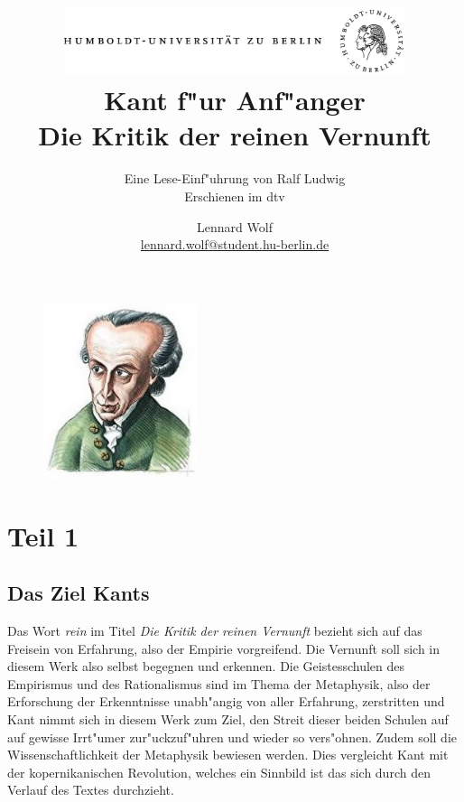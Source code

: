 \documentclass[]{scrartcl}
\begin{document}
\title{
	\includegraphics*[width=0.75\textwidth]{images/hu_logo.png}\\
	\vspace{24pt}
	Kant f"ur Anf"anger\\Die Kritik der reinen Vernunft}
\subtitle{Eine Lese-Einf"uhrung von Ralf Ludwig\\
          Erschienen im dtv}
\author{Lennard Wolf\\
        \href{mailto:lennard.wolf@student.hu-berlin.de}{lennard.wolf@student.hu-berlin.de}}
\maketitle

\begin{figure}[h]
	\centering
	\includegraphics[width=0.4\textwidth]{images/kant/kant_a.jpg}
\end{figure}
\newpage

\tableofcontents
\newpage

\section{Teil 1}

\subsection{Das Ziel Kants}

Das Wort \emph{rein} im Titel \emph{Die Kritik der reinen Vernunft} bezieht sich auf das Freisein von Erfahrung, also der Empirie vorgreifend. Die Vernunft soll sich in diesem Werk also selbst begegnen und erkennen. Die Geistesschulen des Empirismus und des Rationalismus sind im Thema der Metaphysik, also der Erforschung der Erkenntnisse unabh"angig von aller Erfahrung, zerstritten und Kant nimmt sich in diesem Werk zum Ziel, den Streit dieser beiden Schulen auf auf gewisse Irrt"umer zur"uckzuf"uhren und wieder so vers"ohnen. Zudem soll die Wissenschaftlichkeit der Metaphysik bewiesen werden. Dies vergleicht Kant mit der kopernikanischen Revolution, welches ein Sinnbild ist das sich durch den Verlauf des Textes durchzieht.
\end{document}
